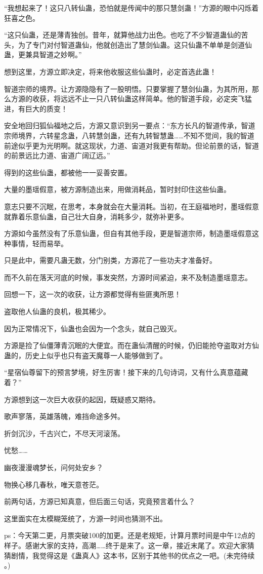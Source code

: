 \begin{this_body}
“我想起来了！这只八转仙蛊，恐怕就是传闻中的那只慧剑蛊！”方源的眼中闪烁着狂喜之色。

“这只仙蛊，还是薄青独创。昔年，就算他战力出色。也吃了不少智道蛊仙的苦头，为了专门对付智道蛊仙，他就创造出了慧剑仙蛊。这只仙蛊不单单是剑道仙蛊，更兼具智道之妙啊。”

想到这里，方源立即决定，将来他收服这些仙蛊时，必定首选此蛊！

智道宗师的境界。让方源隐隐有了一股明悟。只要掌握了慧剑仙蛊，为其所用，那么方源的收获，将远远不止一只八转仙蛊这样简单。他的智道手段，必定突飞猛进，有巨大的质变！

安全地回归狐仙福地之后，方源又意识到另一要点：“东方长凡的智道传承，智道宗师境界，六转星念蛊，八转慧剑蛊，还有九转智慧蛊……不知不觉间，我的智道前途似乎更为光明啊。就这现状，力道、宙道对我更有帮助。但论前景的话，智道的前景远比力道、宙道广阔辽远。”

得到的这些仙蛊，都被他一一妥善安置。

大量的墨瑶假意，被方源制造出来，用做消耗品，暂时封印住这些仙蛊。

意志只要不沉眠，在思考，本身就会在大量消耗。当初，在王庭福地时，墨瑶假意就靠着乐意仙蛊，自己壮大自身，消耗多少，就弥补更多。

方源如今虽然没有了乐意仙蛊，但自有其他手段，更是智道宗师，制造墨瑶假意这种事情，轻而易举。

只是此中，需要凡蛊无数，分门别类，方源花了一些功夫才准备好。

而不久前在落天河底的时候，事发突然，方源时间紧迫，来不及制造墨瑶意志。

回想一下，这一次的收获，让方源都觉得有些匪夷所思！

盗取他人仙蛊的良机，极其稀少。

因为正常情况下，仙蛊也会因为一个念头，就自己毁灭。

方源是捡了仙僵薄青沉眠的大便宜。而在蛊仙清醒的时候，仍旧能抢夺盗取对方仙蛊的，历史上似乎也只有盗天魔尊一人能够做到了。

“星宿仙尊留下的预言梦境，好生厉害！接下来的几句诗词，又有什么真意蕴藏着？”

方源想到这一次巨大收获的起因，既疑惑又期待。

歌声寥落，英雄落魄，难挡命途多舛。

折剑沉沙，千古兴亡，不尽天河滚荡。

忧愁……

幽夜漫漫魂梦长，问何处安乡？

物换心移几春秋，唯天意苍茫。

前两句话，方源已知真意，但后面三句话，究竟预言着什么？

这里面实在太模糊笼统了，方源一时间也猜测不出。

ps：今天第二更，月票突破100的加更。还是老规矩，计算月票时间是中午12点的样子。感谢大家的支持，高潮……终于是来了。这一章，接近末尾了。欢迎大家猜猜剧情，我觉得这是《蛊真人》这本书，区别于其他书的优点之一吧。(未完待续 。)

\end{this_body}

